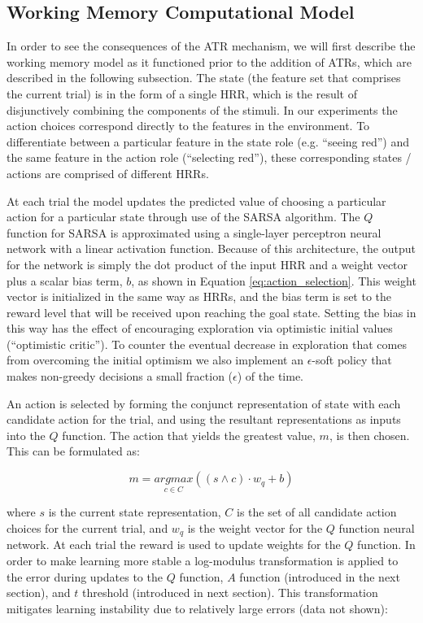 \documentclass[10pt,letterpaper]{article}
\begin{document}
\subsection{Working Memory Computational Model}

In order to see the consequences of the ATR mechanism, we will first describe the working memory model as it functioned prior to the addition of ATRs, which are described in the following subsection. The state (the feature set that comprises the current trial) is in the form of a single HRR, which is the result of disjunctively combining the components of the stimuli. In our experiments the action choices correspond directly to the features in the environment. To differentiate between a particular feature in the state role (e.g. ``seeing red'') and the same feature in the action role (``selecting red''), these corresponding states / actions are comprised of different HRRs.

At each trial the model updates the predicted value of choosing a particular action for a particular state through use of the SARSA algorithm. The $ Q $ function for SARSA is approximated using a single-layer perceptron neural network with a linear activation function. Because of this architecture, the output for the network is simply the dot product of the input HRR and a weight vector plus a scalar bias term, $b$, as shown in Equation \ref{eq:action_selection}. This weight vector is initialized in the same way as HRRs, and the bias term is set to the reward level that will be received upon reaching the goal state. Setting the bias in this way has the effect of encouraging exploration via optimistic initial values (``optimistic critic''). To counter the eventual decrease in exploration that comes from overcoming the initial optimism we also implement an $ \epsilon $-soft policy that makes non-greedy decisions a small fraction ($\epsilon$) of the time.  

An action is selected by forming the conjunct representation of state with each candidate action for the trial, and using the resultant representations as inputs into the $ Q $ function. The action that yields the greatest value, $m$, is then chosen. This can be formulated as:

\begin{equation}
m = \underset{c \in C}{argmax}((s \wedge c) \cdot w_{q}+b)
\label{eq:action_selection}
\end{equation}

\noindent where $ s $ is the current state representation, $ C $ is the set of all candidate action choices for the current trial, and $ w_{q} $ is the weight vector for the $ Q $ function neural network. At each trial the reward is used to update weights for the $Q$ function. In order to make learning more stable a log-modulus transformation \cite{john_alternative_1980} is applied to the error during updates to the $ Q $ function, $ A $ function (introduced in the next section), and $t$ threshold (introduced in next section). This transformation mitigates learning instability due to relatively large errors (data not shown):
\end{document}
